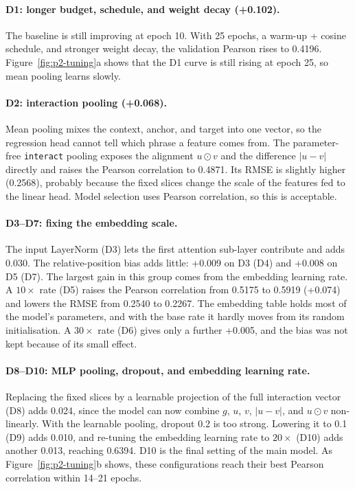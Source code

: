\documentclass[11pt,a4paper]{article}
\begin{document}
\paragraph{D1: longer budget, schedule, and weight decay (+0.102).}
The baseline is still improving at epoch 10. With 25 epochs, a
warm-up + cosine schedule, and stronger weight decay, the validation
Pearson rises to 0.4196. Figure~\ref{fig:p2-tuning}a shows that the D1
curve is still rising at epoch 25, so mean pooling learns slowly.

\paragraph{D2: interaction pooling (+0.068).}
Mean pooling mixes the context, anchor, and target into one vector, so
the regression head cannot tell which phrase a feature comes from. The
parameter-free \texttt{interact} pooling exposes the alignment
$u\odot v$ and the difference $|u-v|$ directly and raises the Pearson
correlation to 0.4871. Its RMSE is slightly higher (0.2568), probably
because the fixed slices change the scale of the features fed to the
linear head. Model selection uses Pearson correlation, so this is
acceptable.

\paragraph{D3--D7: fixing the embedding scale.}
The input LayerNorm (D3) lets the first attention sub-layer contribute
and adds 0.030. The relative-position bias adds little: +0.009 on D3
(D4) and +0.008 on D5 (D7). The largest gain in this group comes from
the embedding learning rate. A $10\times$ rate (D5) raises the Pearson
correlation from 0.5175 to 0.5919 (+0.074) and lowers the RMSE from
0.2540 to 0.2267. The embedding table holds most of the model's
parameters, and with the base rate it hardly moves from its random
initialisation. A $30\times$ rate (D6) gives only a further +0.005, and
the bias was not kept because of its small effect.

\paragraph{D8--D10: MLP pooling, dropout, and embedding learning rate.}
Replacing the fixed slices by a learnable projection of the full
interaction vector (D8) adds 0.024, since the model can now combine $g$,
$u$, $v$, $|u-v|$, and $u\odot v$ non-linearly. With the learnable
pooling, dropout 0.2 is too strong. Lowering it to 0.1 (D9) adds 0.010,
and re-tuning the embedding learning rate to $20\times$ (D10) adds
another 0.013, reaching 0.6394. D10 is the final setting of the main
model. As Figure~\ref{fig:p2-tuning}b shows, these configurations reach
their best Pearson correlation within 14--21 epochs.
\end{document}

